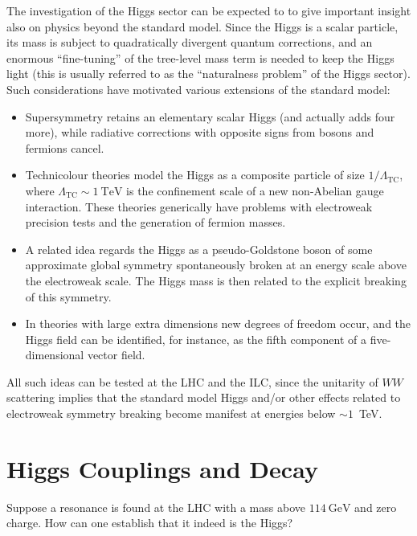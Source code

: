 \documentclass[12pt]{report}
\newcommand{\2}{\ensuremath{\sqrt{2}\,}}
\begin{document}
{    The investigation of the Higgs sector can be expected to
    to give important insight also on physics beyond the standard model. Since the Higgs is
    a scalar particle, its mass is subject to quadratically divergent quantum corrections,
    and an enormous ``fine-tuning'' of the tree-level mass term is needed to keep the Higgs light 
    (this is usually
    referred to as the ``naturalness problem'' of the Higgs sector).  
    Such considerations have motivated various extensions of the standard model:
    \begin{itemize}
      \item Supersymmetry retains an elementary scalar Higgs (and actually adds four more), while
        radiative corrections with opposite signs from bosons and fermions cancel.
      \item Technicolour theories model the Higgs as a composite particle of size 
        $1/\Lambda_\text{TC}$, where $\Lambda_\text{TC} \sim 1\ \text{TeV}$ is the confinement
         scale of a new non-Abelian gauge interaction. These
        theories generically have problems with electroweak precision tests and the generation of 
        fermion  masses.
      \item A related idea regards the Higgs as a pseudo-Goldstone boson of some approximate
        global symmetry spontaneously broken at an energy scale above the electroweak scale. The
        Higgs mass is then related to the explicit breaking of this symmetry.
      \item In theories with large extra dimensions new degrees of freedom occur, and the Higgs 
        field can be identified, for instance, as the fifth component of a
        five-dimensional vector field.
    \end{itemize}
    All such ideas can be tested at the LHC and the ILC, since the unitarity
    of $WW$ scattering implies that the standard model Higgs and/or other effects related
    to electroweak symmetry breaking become manifest at energies below $\sim 1$~TeV.

    \section{Higgs Couplings and Decay}
      Suppose a resonance is found at the LHC with a mass above $114\ \text{GeV}$ and zero charge.
      How can one
      establish that it indeed is the Higgs?
      
}
\end{document}
